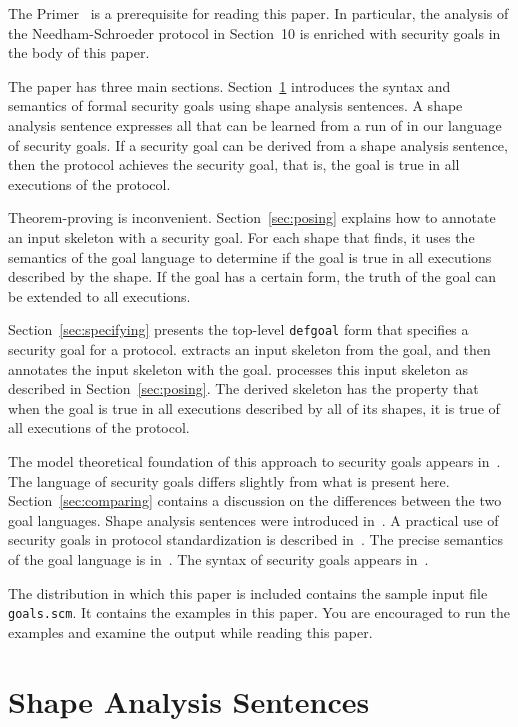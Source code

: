 \documentclass[12pt]{article}
\begin{document}
The {\cpsa} Primer~\cite{cpsaprimer09} is a prerequisite for reading
this paper.  In particular, the analysis of the Needham-Schroeder
protocol in Section~10 is enriched with security goals in the body of
this paper.

The paper has three main sections.  Section~\ref{sec:sas} introduces
the syntax and semantics of formal security goals using shape analysis
sentences.  A shape analysis sentence expresses all that can be
learned from a run of {\cpsa} in our language of security goals.  If a
security goal can be derived from a shape analysis sentence, then the
protocol achieves the security goal, that is, the goal is true in all
executions of the protocol.

Theorem-proving is inconvenient.  Section~\ref{sec:posing} explains
how to annotate an input skeleton with a security goal.  For each
shape that {\cpsa} finds, it uses the semantics of the goal language
to determine if the goal is true in all executions described by the
shape.  If the goal has a certain form, the truth of the goal can be
extended to all executions.

Section~\ref{sec:specifying} presents the top-level \texttt{defgoal}
form that specifies a security goal for a protocol.  {\cpsa} extracts
an input skeleton from the goal, and then annotates the input skeleton
with the goal.  {\cpsa} processes this input skeleton as described in
Section~\ref{sec:posing}.  The derived skeleton has the property that
when the goal is true in all executions described by all of its shapes,
it is true of all executions of the protocol.

The model theoretical foundation of this approach to security goals
appears in~\cite{Guttman14}.  The language of security goals differs
slightly from what is present here.  Section~\ref{sec:comparing}
contains a discussion on the differences between the two goal
languages.  Shape analysis sentences were introduced
in~\cite{Ramsdell12}.  A practical use of security goals in protocol
standardization is described in~\cite{GuttmanLiskovRowe14}.  The
precise semantics of the goal language is in~\cite{cpsaspec09}.  The
syntax of security goals appears in~\cite[Table~2]{cpsaprimer09}.

The distribution in which this paper is included contains the sample
input {\cpsa} file \texttt{goals.scm}.  It contains the examples in
this paper.  You are encouraged to run the examples and examine the
output while reading this paper.

\section{Shape Analysis Sentences}\label{sec:sas}
\end{document}
